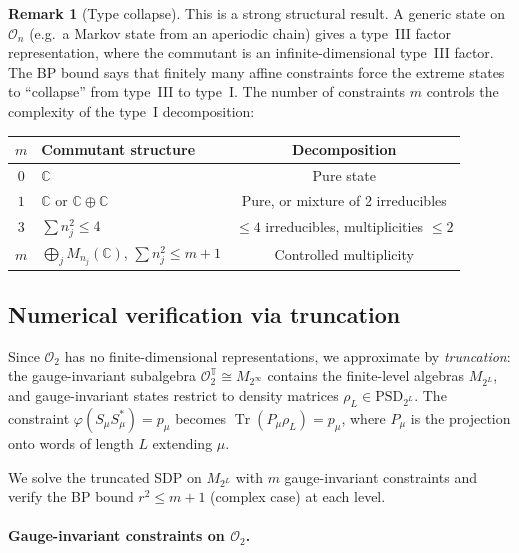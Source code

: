 \documentclass[11pt,a4paper]{article}
\theoremstyle{definition}
\newtheorem{remark}[theorem]{Remark}
\newcommand{\PSD}{\mathrm{PSD}}
\newcommand{\Tr}{\operatorname{Tr}}
\begin{document}
\begin{remark}[Type collapse]
This is a strong structural result.  A generic state on
$\mathcal{O}_n$ (e.g.\ a Markov state from an aperiodic chain)
gives a type~III factor representation, where the commutant is
an infinite-dimensional type~III factor.  The BP bound says that
finitely many affine constraints force the extreme states to
``collapse'' from type~III to type~I.  The number of constraints
$m$ controls the complexity of the type~I decomposition:
\begin{center}
\begin{tabular}{clc}
\toprule
$m$ & \textbf{Commutant structure} & \textbf{Decomposition} \\
\midrule
$0$ & $\mathbb{C}$ & Pure state \\
$1$ & $\mathbb{C}$ or $\mathbb{C} \oplus \mathbb{C}$
  & Pure, or mixture of 2 irreducibles \\
$3$ & $\sum n_j^2 \leq 4$
  & $\leq 4$ irreducibles, multiplicities $\leq 2$ \\
$m$ & $\bigoplus_j M_{n_j}(\mathbb{C})$, $\sum n_j^2 \leq m+1$
  & Controlled multiplicity \\
\bottomrule
\end{tabular}
\end{center}
\end{remark}

\subsection{Numerical verification via truncation}

Since $\mathcal{O}_2$ has no finite-dimensional representations,
we approximate by \emph{truncation}: the gauge-invariant subalgebra
$\mathcal{O}_2^{\mathbb{T}} \cong M_{2^\infty}$ contains the
finite-level algebras $M_{2^L}$, and gauge-invariant states
restrict to density matrices $\rho_L \in \PSD_{2^L}$.  The
constraint $\varphi(S_\mu S_\mu^*) = p_\mu$ becomes
$\Tr(P_\mu \rho_L) = p_\mu$, where $P_\mu$ is the projection
onto words of length $L$ extending $\mu$.

We solve the truncated SDP on $M_{2^L}$ with $m$ gauge-invariant
constraints and verify the BP bound $r^2 \leq m + 1$ (complex case)
at each level.

\paragraph{Gauge-invariant constraints on $\mathcal{O}_2$.}
\end{document}
